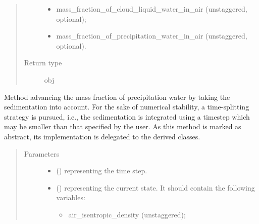 \documentclass[letterpaper,10pt,english]{sphinxmanual}
\begin{document}
\begin{fulllineitems}
\begin{fulllineitems}
\begin{quote}
\begin{description}
\begin{itemize}
\item {} 
mass\_fraction\_of\_cloud\_liquid\_water\_in\_air (unstaggered, optional);

\item {} 
mass\_fraction\_of\_precipitation\_water\_in\_air (unstaggered, optional).

\end{itemize}


\item[{Return type}] \leavevmode
obj

\end{description}\end{quote}

\end{fulllineitems}


\begin{fulllineitems}
\label{\detokenize{api:tasmania.dycore.prognostic_isentropic_nonconservative.PrognosticIsentropicNonconservative.step_integrating_sedimentation_flux}}
Method advancing the mass fraction of precipitation water by taking the sedimentation into account.
For the sake of numerical stability, a time-splitting strategy is pursued, i.e., the sedimentation is
integrated using a timestep which may be smaller than that specified by the user.
As this method is marked as abstract, its implementation is delegated to the derived classes.
\begin{quote}\begin{description}
\item[{Parameters}] \leavevmode\begin{itemize}
\item {} 
 () \textendash{}  representing the time step.

\item {} 
 () \textendash{} 
{\hyperref[\detokenize{api:tasmania.storages.state_isentropic.StateIsentropic}]{}} representing the current state.
It should contain the following variables:
\begin{itemize}
\item {} 
air\_isentropic\_density (unstaggered);


\end{itemize}
\end{itemize}
\end{description}
\end{quote}
\end{fulllineitems}
\end{fulllineitems}
\end{document}
